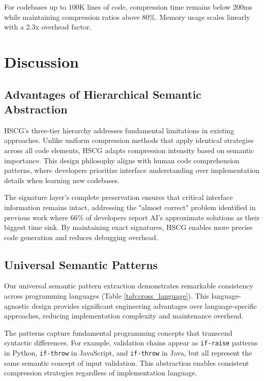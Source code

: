 \documentclass[conference]{IEEEtran}
\begin{document}
For codebases up to 100K lines of code, compression time remains below 200ms while maintaining compression ratios above 80\%. Memory usage scales linearly with a 2.3x overhead factor.

\section{Discussion}

\subsection{Advantages of Hierarchical Semantic Abstraction}

HSCG's three-tier hierarchy addresses fundamental limitations in existing approaches. Unlike uniform compression methods that apply identical strategies across all code elements, HSCG adapts compression intensity based on semantic importance. This design philosophy aligns with human code comprehension patterns, where developers prioritize interface understanding over implementation details when learning new codebases.

The signature layer's complete preservation ensures that critical interface information remains intact, addressing the "almost correct" problem identified in previous work \cite{stackoverflow2025survey} where 66\% of developers report AI's approximate solutions as their biggest time sink. By maintaining exact signatures, HSCG enables more precise code generation and reduces debugging overhead.

\subsection{Universal Semantic Patterns}

Our universal semantic pattern extraction demonstrates remarkable consistency across programming languages (Table \ref{tab:cross_language}). This language-agnostic design provides significant engineering advantages over language-specific approaches, reducing implementation complexity and maintenance overhead.

The patterns capture fundamental programming concepts that transcend syntactic differences. For example, validation chains appear as \texttt{if-raise} patterns in Python, \texttt{if-throw} in JavaScript, and \texttt{if-throw} in Java, but all represent the same semantic concept of input validation. This abstraction enables consistent compression strategies regardless of implementation language.
\end{document}
